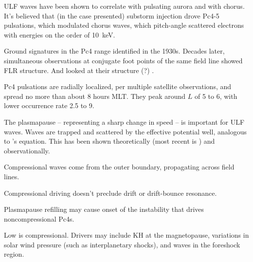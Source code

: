 
ULF waves have been shown to correlate with pulsating aurora and with chorus\cite{jaynes_2015}. It's believed that (in the case presented) substorm injection drove Pc4-5 pulsations, which modulated chorus waves, which pitch-angle scattered electrons with energies on the order of \SI{10}{\kilo\eV}. 


Ground signatures in the Pc4 range identified in the 1930s\cite{angenheister_1931}. Decades later, simultaneous observations at conjugate foot points of the same field line showed FLR structure\cite{sigura_1961}. And looked at their structure (?) \cite{nagata_1963}. 


Pc4 pulsations are radially localized, per multiple satellite observations\cite{engebretson_1992}, and spread no more than about 8 hours MLT. They peak around $L$ of 5 to 6, with lower occurrence rate 2.5 to 9\cite{anderson_1990,liu_2009}.


The plasmapause -- representing a sharp change in \Alfven speed -- is important for ULF waves. Waves are trapped and scattered by the effective potential well, analogous to \Schrodinger's equation\cite{lee_1998,lee_1999,dai_2009}. This has been shown theoretically\cite{klimushkin_1998,leonovich_2000,klimushkin_2004,mager_2013} (most recent is \cite{mager_2013}) and observationally\cite{takahashi_2009,takahashi_2010}. 


Compressional waves come from the outer boundary, propagating across field lines\cite{lysak_1992}. 

Compressional driving doesn't preclude drift or drift-bounce resonance\cite{zong_2007,zong_2009}. 

Plasmapause refilling may cause onset of the instability that drives noncompressional Pc4s\cite{engebretson_1992,liu_2013}. 

Low \azm is compressional\cite{hughes_1994}. Drivers may include KH at the magnetopause\cite{chen_1974,southwood_1974,liu_2011}, variations in solar wind pressure (such as interplanetary shocks)\cite{zong_2007,zong_2009,hao_2014,degeling_2014,kessel_2008}, and waves in the foreshock region\cite{russell_1983,takahashi_2015}. 

